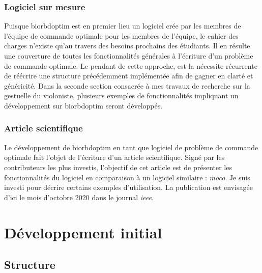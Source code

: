             \subsection{Logiciel sur mesure}
            
Puisque \gls{biorbdoptim} est en premier lieu un logiciel crée par les membres de l'équipe de commande optimale pour les membres de l'équipe, le cahier des charges n'existe qu'au travers des besoins prochains des étudiants. Il en résulte une couverture de toutes les fonctionnalités générales à l'écriture d'un problème de commande optimale.
Le pendant de cette approche, est la nécessite récurrente de réécrire une structure précédemment implémentée afin de gagner en clarté et généricité.
Dans la seconde section consacrée à mes travaux de recherche sur la gestuelle du violoniste, plusieurs exemples de fonctionnalités impliquant un développement sur \gls{biorbdoptim} seront développés.

            \subsection{Article scientifique}
            
Le développement de \gls{biorbdoptim} en tant que logiciel de problème de commande optimale fait l'objet de l'écriture d'un article scientifique. Signé par les contributeurs les plus investis, l’objectif de cet article est de présenter les fonctionnalités du logiciel en comparaison à un logiciel similaire : \emph{\gls{moco}}. Je suis investi pour décrire certains exemples d'utilisation. La publication est envisagée d'ici le mois d'octobre 2020 dans le journal \emph{\gls{ieee}}\footnotemark[5].






    \chapter{Développement initial}
        \section{Structure}

